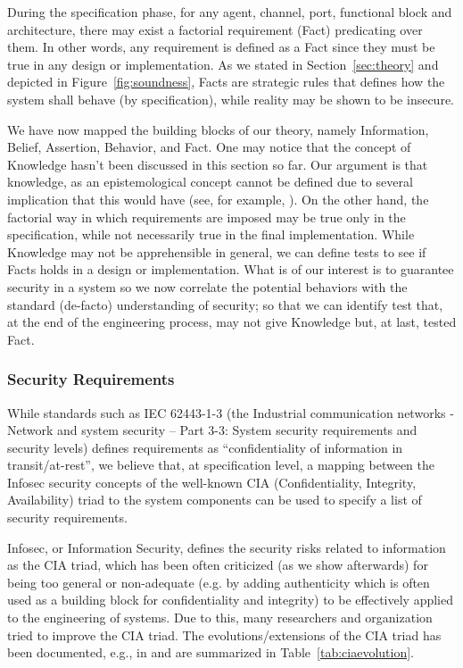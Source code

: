During the specification phase, for any agent, channel, port, functional block
and architecture, there may exist a factorial requirement (Fact) predicating over them.
In other words, any requirement is defined as a Fact since they must be true in
any design or implementation. As we stated in Section~\ref{sec:theory} and depicted in
Figure~\ref{fig:soundness}, Facts are strategic rules that defines how
the system shall behave (by specification), while reality may be shown to
be insecure.

We have now mapped the building blocks of our theory, namely Information,
Belief, Assertion, Behavior, and Fact. One may notice that the concept of
Knowledge hasn't been discussed in this section so far. Our argument is that
knowledge, as an epistemological concept cannot be defined due to several
implication that this would have (see, for example,
\autocite{Empiricus1990Pyrrhonism}). On the other hand, the factorial way in
which requirements are imposed may be true only in the specification, while not
necessarily true in the final implementation. While Knowledge may not be
apprehensible in general, we can define tests to see if Facts holds in a
design or implementation. What is of our interest is to guarantee security in a
system so we now correlate the potential behaviors with the standard (de-facto)
understanding of security; so that we can identify test that, at the end of the
engineering process, may not give Knowledge but, at last, tested Fact.

\subsubsection{Security Requirements} 
While standards such as IEC 62443-1-3 (the Industrial communication networks -
Network and system security -- Part 3-3: System security requirements and
security levels) defines requirements as ``confidentiality of information in
transit/at-rest'', we believe that, at specification level, a mapping
between the Infosec security concepts of the well-known CIA (Confidentiality,
Integrity, Availability) triad to the system components can be used to specify
a list of security requirements.

Infosec, or Information Security, defines the security risks related to
information as the CIA triad, which has been often criticized
(as we show afterwards) for being too general or non-adequate (e.g. by
adding authenticity which is often used as a building block for confidentiality
and integrity) to be effectively applied to the engineering of systems. Due to
this, many researchers and organization tried to improve the CIA triad.  The
evolutions/extensions of the CIA triad has been documented, e.g., in
\autocite{Samonas2014cia} and are summarized in Table~\ref{tab:ciaevolution}.

